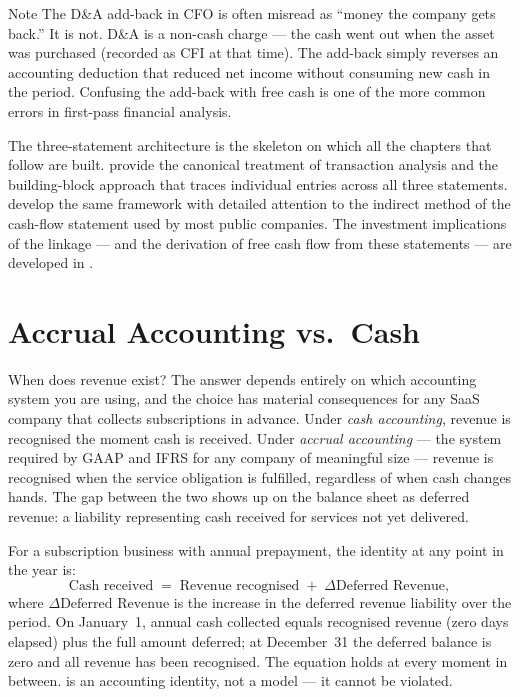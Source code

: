 \begin{admonition}{Note}
The D\&A add-back in CFO is often misread as ``money the company gets back.'' It is not. D\&A
is a non-cash charge --- the cash went out when the asset was purchased (recorded as CFI at
that time). The add-back simply reverses an accounting deduction that reduced net income
without consuming new cash in the period. Confusing the add-back with free cash is one of
the more common errors in first-pass financial analysis.
\end{admonition}

The three-statement architecture is the skeleton on which all the chapters that follow are
built. \textcite{libby2022financial} provide the canonical treatment of transaction analysis
and the building-block approach that traces individual entries across all three statements.
\textcite{weygandt2019financial} develop the same framework with detailed attention to the
indirect method of the cash-flow statement used by most public companies. The investment
implications of the linkage --- and the derivation of free cash flow from these statements
--- are developed in \textcite{brealey2020}.

\section{Accrual Accounting vs.\ Cash}\label{sec:accrual}

When does revenue exist? The answer depends entirely on which accounting system you are
using, and the choice has material consequences for any SaaS company that collects
subscriptions in advance. Under \emph{cash accounting}, revenue is recognised the moment
cash is received. Under \emph{accrual accounting} --- the system required by GAAP and IFRS
for any company of meaningful size --- revenue is recognised when the service obligation is
fulfilled, regardless of when cash changes hands. The gap between the two shows up on the
balance sheet as deferred revenue: a liability representing cash received for services not
yet delivered.

For a subscription business with annual prepayment, the identity at any point in the year is:
\begin{equation}\label{eq:accrual-revenue}
  \text{Cash received} \;=\; \text{Revenue recognised} \;+\; \Delta\text{Deferred Revenue},
\end{equation}
where \(\Delta\text{Deferred Revenue}\) is the increase in the deferred revenue liability
over the period. On January~1, annual cash collected equals recognised revenue (zero days
elapsed) plus the full amount deferred; at December~31 the deferred balance is zero and all
revenue has been recognised. The equation holds at every moment in between. 
is an accounting identity, not a model --- it cannot be violated.

